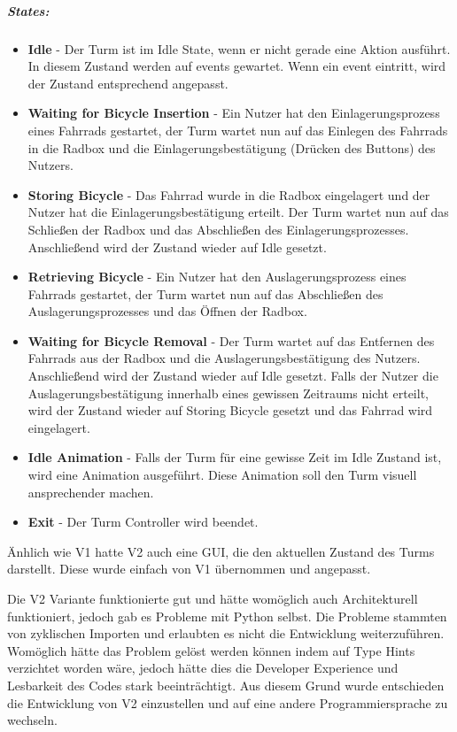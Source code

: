 \subparagraph{States:}
\begin{itemize}
  \item \textbf{Idle} - Der Turm ist im Idle State, wenn er nicht gerade eine Aktion ausführt. In diesem Zustand werden auf \Glspl{event} gewartet. Wenn ein \Gls{event} eintritt, wird der Zustand entsprechend angepasst.
  \item \textbf{Waiting for Bicycle Insertion} - Ein Nutzer hat den Einlagerungsprozess eines Fahrrads gestartet, der Turm wartet nun auf das Einlegen des Fahrrads in die Radbox und die Einlagerungsbestätigung (Drücken des Buttons) des Nutzers.
  \item \textbf{Storing Bicycle} - Das Fahrrad wurde in die Radbox eingelagert und der Nutzer hat die Einlagerungsbestätigung erteilt. Der Turm wartet nun auf das Schließen der Radbox und das Abschließen des Einlagerungsprozesses. Anschließend wird der Zustand wieder auf Idle gesetzt.
  \item \textbf{Retrieving Bicycle} - Ein Nutzer hat den Auslagerungsprozess eines Fahrrads gestartet, der Turm wartet nun auf das Abschließen des Auslagerungsprozesses und das Öffnen der Radbox.
  \item \textbf{Waiting for Bicycle Removal} - Der Turm wartet auf das Entfernen des Fahrrads aus der Radbox und die Auslagerungsbestätigung des Nutzers. Anschließend wird der Zustand wieder auf Idle gesetzt. Falls der Nutzer die Auslagerungsbestätigung innerhalb eines gewissen Zeitraums nicht erteilt, wird der Zustand wieder auf Storing Bicycle gesetzt und das Fahrrad wird eingelagert.
  \item \textbf{Idle Animation} - Falls der Turm für eine gewisse Zeit im Idle Zustand ist, wird eine Animation ausgeführt. Diese Animation soll den Turm visuell ansprechender machen.
  \item \textbf{Exit} - Der Turm Controller wird beendet.
\end{itemize}

Änhlich wie V1 hatte V2 auch eine \ac{GUI}, die den aktuellen Zustand des Turms darstellt. Diese wurde einfach von V1 übernommen und angepasst.

Die V2 Variante funktionierte gut und hätte womöglich auch Architekturell funktioniert, jedoch gab es Probleme mit Python selbst. Die Probleme stammten von zyklischen Importen und erlaubten es nicht die Entwicklung weiterzuführen. Womöglich hätte das Problem gelöst werden können indem auf Type Hints verzichtet worden wäre, jedoch hätte dies die Developer Experience und Lesbarkeit des Codes stark beeinträchtigt. Aus diesem Grund wurde entschieden die Entwicklung von V2 einzustellen und auf eine andere Programmiersprache zu wechseln.
